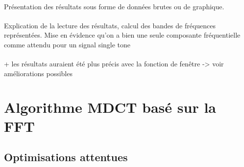 \documentclass{article}
\begin{document}
    \paragraph{}%
    Présentation des résultats sous forme de données brutes ou de graphique.

    \paragraph{}%
    Explication de la lecture des résultats, calcul des bandes de fréquences représentées. Mise en évidence qu'on a bien une seule composante fréquentielle comme attendu pour un signal single tone


    \paragraph{}%
    + les résultats auraient été plus précis avec la fonction de fenêtre -> voir améliorations possibles


    \newpage
    \section{Algorithme MDCT basé sur la FFT}
    \subsection{Optimisations attentues}

\end{document}
